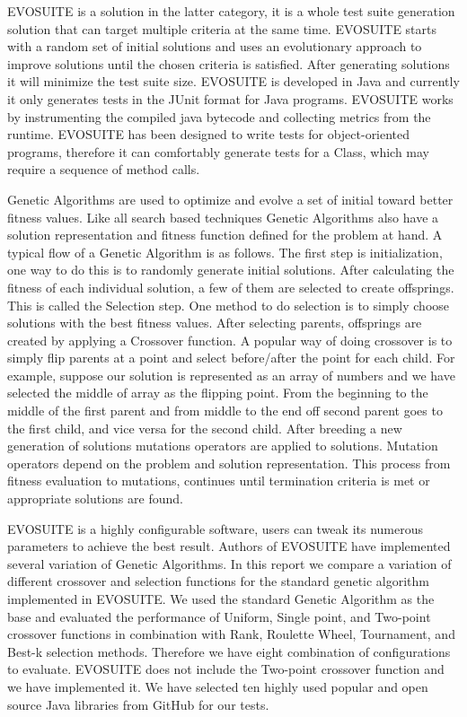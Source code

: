 \documentclass[sigconf]{acmart}
\begin{document}
EVOSUITE is a solution in the latter category, it is a whole test suite generation solution that can
target multiple criteria at the same time. EVOSUITE starts with a random set of initial solutions and uses 
an evolutionary approach to improve solutions until the chosen criteria is satisfied.
After generating solutions it will minimize the test suite size. EVOSUITE is developed in Java and currently 
it only generates tests in the JUnit format for Java programs. EVOSUITE works by instrumenting the compiled 
java bytecode and collecting metrics from the runtime. EVOSUITE has been designed to write tests 
for object-oriented programs, therefore it can comfortably generate tests for a Class, 
which may require a sequence of method calls. 

Genetic Algorithms are used to optimize and evolve a set of initial toward better fitness values.
Like all search based techniques Genetic Algorithms also have a solution representation and fitness function 
defined for the problem at hand. A typical flow of a Genetic Algorithm is as follows. 
The first step is initialization, one way to do this is to randomly generate initial solutions. After calculating
the fitness of each individual solution, a few of them are selected to create offsprings. This is called 
the Selection step. One method to do selection is to simply choose solutions with the best fitness values.
After selecting parents, offsprings are created by applying a Crossover function. A popular way of doing crossover
is to simply flip parents at a point and select before/after the point for each child. For example, suppose
our solution is represented as an array of numbers and we have selected the middle of array as the flipping point.
From the beginning to the middle of the first parent and from middle to the end off
second parent goes to the first child, and vice versa for the second child. After breeding a new generation of
solutions mutations operators are applied to solutions. Mutation operators depend on the problem and 
solution representation. This process from fitness evaluation to mutations, continues until termination criteria
is met or appropriate solutions are found.

EVOSUITE is a highly configurable software, users can tweak its numerous parameters to achieve the best result. 
Authors of EVOSUITE have implemented several variation of Genetic Algorithms. In this report we compare 
a variation of different crossover and selection functions for the standard genetic algorithm implemented in EVOSUITE.
We used the standard Genetic Algorithm as the base and evaluated the performance of 
Uniform, Single point, and Two-point crossover functions in combination with Rank, Roulette Wheel, Tournament, 
and Best-k selection methods. Therefore we have eight combination of configurations to evaluate. 
EVOSUITE does not include the Two-point crossover function and we have implemented it.
We have selected ten highly used popular and open source Java libraries from GitHub for our tests.
\end{document}
